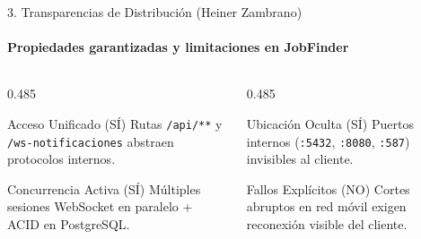 \documentclass[aspectratio=169,10pt]{beamer}
\begin{document}
\begin{frame}{3. Transparencias de Distribución (Heiner Zambrano)}
  \framesubtitle{Propiedades garantizadas y limitaciones en JobFinder}
  \vspace{0.12cm}
  \begin{columns}[T,totalwidth=\textwidth]
    \begin{column}{0.485\textwidth}
      \begin{bluecard}{Acceso Unificado (SÍ)}
        \footnotesize Rutas \texttt{/api/**} y \texttt{/ws-notificaciones} abstraen protocolos internos.
      \end{bluecard}
      \vspace{0.25cm}
      \begin{bluecard}{Concurrencia Activa (SÍ)}
        \footnotesize Múltiples sesiones WebSocket en paralelo + ACID en PostgreSQL.
      \end{bluecard}
    \end{column}
    \begin{column}{0.485\textwidth}
      \begin{bluecard}{Ubicación Oculta (SÍ)}
        \footnotesize Puertos internos (\texttt{:5432}, \texttt{:8080}, \texttt{:587}) invisibles al cliente.
      \end{bluecard}
      \vspace{0.25cm}
      \begin{ambercard}{Fallos Explícitos (NO)}
        \footnotesize Cortes abruptos en red móvil exigen reconexión visible del cliente.
      \end{ambercard}
    \end{column}
  \end{columns}
\end{frame}
\end{document}
